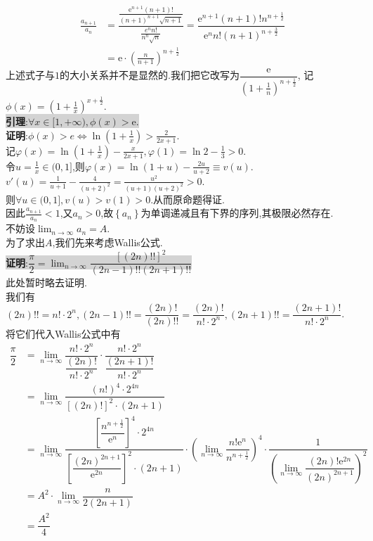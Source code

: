 \documentclass[a4paper,oneside]{ctexart}
\newcommand{\e}{\mathrm{e}}
\begin{document}
$$\begin{aligned}
    \frac{a_{n+1}}{a_n} &= \dfrac{\frac{\e^{n+1}(n+1)!}{(n+1)^{n+1}\sqrt{n+1}}}{\frac{e^nn!}{n^n\sqrt{n}}}
                         = \dfrac{\e^{n+1}(n+1)!n^{n+\frac{1}{2}}}{\e^nn!(n+1)^{n+\frac{3}{2}}} \\
                        &= \e\cdot\left(\frac{n}{n+1}\right)^{n+\frac{1}{2}}
\end{aligned}$$
上述式子与$1$的大小关系并不是显然的.我们把它改写为$\dfrac{\e}{\left(1+\frac{1}{n}\right)^{n+\frac{1}{2}}}$,
记$\phi(x)=\left(1+\frac{1}{x}\right)^{x+\frac{1}{2}}.$\\
\colorbox{lightgray}{\textbf{引理}:$\forall x\in [1,+\infty),\phi(x)>\e.$}\\
\textbf{证明}:$\phi(x)>e \Leftrightarrow \ln\left(1+\frac{1}{x}\right)>\frac{2}{2x+1}.$\\
记$\varphi(x)=\ln\left(1+\frac{1}{x}\right)-\frac{x}{2x+1},\varphi(1)=\ln{2}-\frac{1}{3}>0$.\\
令$u=\frac{1}{x}\in(0,1]$,则$\varphi(x)=\ln{(1+u)-\frac{2u}{u+2}}\equiv v(u).$\\
$v'(u)=\frac{1}{u+1}-\frac{4}{(u+2)^2}=\frac{u^2}{(u+1)(u+2)^2}>0.$\\
则$\forall u\in(0,1],v(u)>v(1)>0$.从而原命题得证.\\
因此$\frac{a_{n+1}}{a_n}<1$,又$a_n>0$,故$\left\{a_n\right\}$为单调递减且有下界的序列,其极限必然存在.\\
不妨设$\lim_{n\to\infty}{a_n}=A$.\\
为了求出$A$,我们先来考虑Wallis公式.\\
\colorbox{lightgray}{\textbf{证明}:$\dfrac{\pi}{2}=\lim_{n\to\infty}\dfrac{\left[(2n)!!\right]^2}{(2n-1)!!(2n+1)!!}$}\\
此处暂时略去证明.\\
我们有$(2n)!!=n!\cdot2^n,(2n-1)!!=\dfrac{(2n)!}{(2n)!!}=\dfrac{(2n)!}{n!\cdot2^n},(2n+1)!!=\dfrac{(2n+1)!}{n!\cdot2^n}$.\\
将它们代入Wallis公式中有
$$\begin{aligned}
    \dfrac{\pi}{2} &= \lim_{n\to\infty}{\dfrac{n!\cdot2^n}{\dfrac{(2n)!}{n!\cdot2^n}}\cdot\dfrac{n!\cdot2^n}{\dfrac{(2n+1)!}{n!\cdot2^n}}} \\
                   &= \lim_{n\to\infty}{\dfrac{(n!)^4\cdot 2^{4n}}{\left[(2n)!\right]^2\cdot (2n+1)}} \\
                   &= \lim_{n\to\infty}{\dfrac{\left[\dfrac{n^{n+\frac{1}{2}}}{\e^n}\right]^4\cdot 2^{4n}}{\left[\dfrac{(2n)^{2n+1}}{\e^{2n}}\right]^2\cdot(2n+1)}}
                      \cdot\left(\lim_{n\to\infty}{\dfrac{n!\e^n}{n^{n+\frac{1}{2}}}}\right)^4
                      \cdot\dfrac{1}{\left(\lim_{n\to\infty}{\dfrac{(2n)!\e^{2n}}{(2n)^{2n+1}}}\right)^2} \\
                   &= A^2\cdot\lim_{n\to\infty}{\dfrac{n}{2(2n+1)}} \\
                   &= \dfrac{A^2}{4}
\end{aligned}$$
\end{document}
